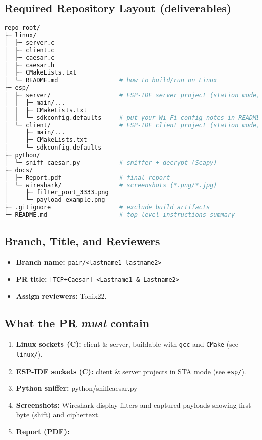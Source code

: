 \documentclass[11pt]{article}
\begin{document}
\subsection*{Required Repository Layout (deliverables)}
\begin{lstlisting}[language=bash]
repo-root/
├─ linux/
│  ├─ server.c
│  ├─ client.c
│  ├─ caesar.c
│  ├─ caesar.h
│  ├─ CMakeLists.txt
│  └─ README.md                 # how to build/run on Linux
├─ esp/
│  ├─ server/                   # ESP-IDF server project (station mode)
│  │  ├─ main/...
│  │  ├─ CMakeLists.txt
│  │  └─ sdkconfig.defaults     # put your Wi-Fi config notes in README
│  └─ client/                   # ESP-IDF client project (station mode)
│     ├─ main/...
│     ├─ CMakeLists.txt
│     └─ sdkconfig.defaults
├─ python/
│  └─ sniff_caesar.py           # sniffer + decrypt (Scapy)
├─ docs/
│  ├─ Report.pdf                # final report
│  └─ wireshark/                # screenshots (*.png/*.jpg)
│     ├─ filter_port_3333.png
│     └─ payload_example.png
├─ .gitignore                   # exclude build artifacts
└─ README.md                    # top-level instructions summary
\end{lstlisting}

\subsection*{Branch, Title, and Reviewers}
\begin{itemize}
  \item \textbf{Branch name:} \texttt{pair/\textless lastname1-lastname2\textgreater}
  \item \textbf{PR title:} \texttt{[TCP+Caesar] \textless Lastname1 \& Lastname2\textgreater}
  \item \textbf{Assign reviewers:} Tonix22.
\end{itemize}

\subsection*{What the PR \textit{must} contain}
\begin{enumerate}
  \item \textbf{Linux sockets (C):} client \& server, buildable with \texttt{gcc} and \texttt{CMake} (see \texttt{linux/}).
  \item \textbf{ESP-IDF sockets (C):} client \& server projects in STA mode (see \texttt{esp/}).
  \item \textbf{Python sniffer:} python/sniffcaesar.py
  \item \textbf{Screenshots:} Wireshark display filters and captured payloads showing first byte (shift) and ciphertext.
  \item \textbf{Report (PDF):}
\end{enumerate}
\end{document}
